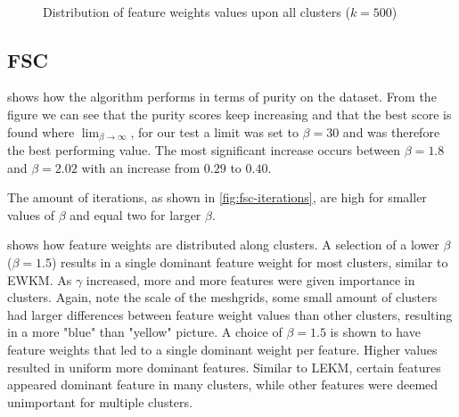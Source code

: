 \documentclass[../report.tex]{subfiles}
\begin{document}
\newpage
\begin{figure}[H]
\\
\caption{Distribution of feature weights values upon all clusters ($k=500$)}
\label{fig:lekm-distribution}
\end{figure}
\newpage

\subsection{FSC}
 shows how the algorithm performs in terms of purity on the dataset. From the figure we can see that the purity scores keep increasing and that the best score is found where $\lim_{\beta \to{\infty}}$, for our test a limit was set to $\beta=30$ and was therefore the best performing value. The most significant increase occurs between $\beta=1.8$ and $\beta=2.02$ with an increase from $0.29$ to $0.40$.

The amount of iterations, as shown in \cref{fig:fsc-iterations}, are high for smaller values of $\beta$ and equal two for larger $\beta$.

 shows how feature weights are distributed along clusters. A selection of a lower $\beta$ ($\beta=1.5$) results in a single dominant feature weight for most clusters, similar to EWKM. As $\gamma$ increased, more and more features were given importance in clusters. Again, note the scale of the meshgrids, some small amount of clusters had larger differences between feature weight values than other clusters, resulting in a more "blue" than "yellow" picture. A choice of $\beta=1.5$ is shown to have feature weights that led to a single dominant weight per feature. Higher values resulted in uniform more dominant features. Similar to LEKM, certain features appeared dominant feature in many clusters, while other features were deemed unimportant for multiple clusters.
\end{document}
